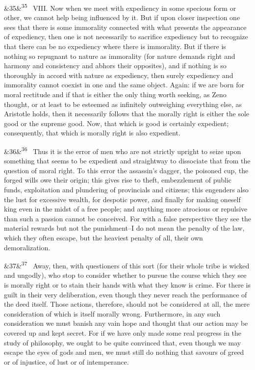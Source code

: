 \documentclass[12pt]{article}
\newcommand{\para}[1][]{\par\noindent\ifx&#1&\else\textsuperscript{\footnotesize #1}~\fi}
\begin{document}
\para[35] VIII. Now when we meet with expediency in some specious form or other, we cannot help being influenced by it. But if upon closer inspection one sees that there is some immorality connected with what presents the appearance of expediency, then one is not necessarily to sacrifice expediency but to recognize that there can be no expediency where there is immorality. But if there is nothing so repugnant to nature as immorality (for nature demands right and harmony and consistency and abhors their opposites), and if nothing is so thoroughly in accord with nature as expediency, then surely expediency and immorality cannot coexist in one and the same object. Again: if we are born for moral rectitude and if that is either the only thing worth seeking, as Zeno thought, or at least to be esteemed as infinitely outweighing everything else, as Aristotle holds, then it necessarily follows that the morally right is either the sole good or the supreme good. Now, that which is good is certainly expedient; consequently, that which is morally right is also expedient.

\para[36] Thus it is the error of men who are not strictly upright to seize upon something that seems to be expedient and straightway to dissociate that from the question of moral right. To this error the assassin's dagger, the poisoned cup, the forged wills owe their origin; this gives rise to theft, embezzlement of public funds, exploitation and plundering of provincials and citizens; this engenders also the lust for excessive wealth, for despotic power, and finally for making oneself king even in the midst of a free people; and anything more atrocious or repulsive than such a passion cannot be conceived. For with a false perspective they see the material rewards but not the punishment--I do not mean the penalty of the law, which they often escape, but the heaviest penalty of all, their own demoralization.

\para[37] Away, then, with questioners of this sort (for their whole tribe is wicked and ungodly), who stop to consider whether to pursue the course which they see is morally right or to stain their hands with what they know is crime. For there is guilt in their very deliberation, even though they never reach the performance of the deed itself. Those actions, therefore, should not be considered at all, the mere consideration of which is itself morally wrong. Furthermore, in any such consideration we must banish any vain hope and thought that our action may be covered up and kept secret. For if we have only made some real progress in the study of philosophy, we ought to be quite convinced that, even though we may escape the eyes of gods and men, we must still do nothing that savours of greed or of injustice, of lust or of intemperance.
\end{document}
